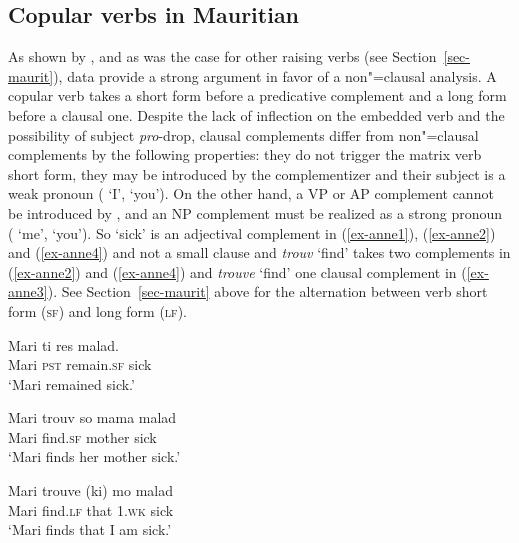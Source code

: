 \subsection{Copular verbs in Mauritian}

As shown by \citet{HenriandLaurens2011}, and as was the case for other raising verbs (see Section~\ref{sec-maurit}),  data
provide a strong argument in favor of a non"=clausal analysis.
A copular verb takes a short form before a
predicative complement and
a long form before a clausal one. Despite the lack of inflection on the embedded verb and the
possibility of subject \emph{pro}-drop, clausal complements differ from non"=clausal complements by the
following properties: they do not trigger the matrix verb short form, they may be introduced by
the complementizer  and their subject is a weak pronoun ( `I',  `you'). On
the other hand, a VP or AP complement cannot be introduced by , and an NP complement must
be realized as a strong pronoun
( `me',  `you'). So  `sick' is an adjectival complement in
(\ref{ex-anne1}), (\ref{ex-anne2}) and (\ref{ex-anne4}) and not a small clause and \emph{trouv} `find' takes
two complements in (\ref{ex-anne2}) and (\ref{ex-anne4}) and \emph{trouve} `find' one clausal complement in (\ref{ex-anne3}). See Section~\ref{sec-maurit}
above for the alternation between verb short form (\textsc{sf}) and long form (\textsc{lf}).

\eal
\ex 
\gll Mari ti res  malad.\\
     Mari \textsc{pst} remain.\textsc{sf} sick\\\hfill\citep[]{HenriandLaurens2011}
\glt `Mari remained sick.' \label{ex-anne1}

\ex 
\gll Mari trouv  so mama malad\\
     Mari find.\textsc{sf} \POSS{} mother sick\\
\glt `Mari finds her mother sick.' \label{ex-anne2}

\ex 
\gll Mari trouve (ki) mo malad\\
     Mari find.\textsc{lf} \hphantom{(}that 1\SG.\textsc{wk} sick\\
\glt `Mari finds that I am sick.' \label{ex-anne3}

